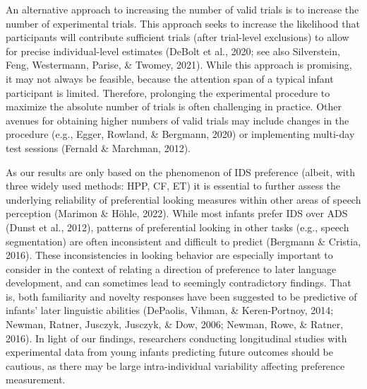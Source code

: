 \documentclass[
  english,
  man,floatsintext]{apa6}
\begin{document}
An alternative approach to increasing the number of valid trials is to increase the number of experimental trials.
This approach seeks to increase the likelihood that participants will contribute sufficient trials (after trial-level exclusions) to allow for precise individual-level estimates (DeBolt et al., 2020; see also Silverstein, Feng, Westermann, Parise, \& Twomey, 2021).
While this approach is promising, it may not always be feasible, because the attention span of a typical infant participant is limited.
Therefore, prolonging the experimental procedure to maximize the absolute number of trials is often challenging in practice.
Other avenues for obtaining higher numbers of valid trials may include changes in the procedure (e.g., Egger, Rowland, \& Bergmann, 2020) or implementing multi-day test sessions (Fernald \& Marchman, 2012).

As our results are only based on the phenomenon of IDS preference (albeit, with three widely used methods: HPP, CF, ET) it is essential to further assess the underlying reliability of preferential looking measures within other areas of speech perception (Marimon \& Höhle, 2022).
While most infants prefer IDS over ADS (Dunst et al., 2012), patterns of preferential looking in other tasks (e.g., speech segmentation) are often inconsistent and difficult to predict (Bergmann \& Cristia, 2016).
These inconsistencies in looking behavior are especially important to consider in the context of relating a direction of preference to later language development, and can sometimes lead to seemingly contradictory findings.
That is, both familiarity and novelty responses have been suggested to be predictive of infants' later linguistic abilities (DePaolis, Vihman, \& Keren-Portnoy, 2014; Newman, Ratner, Jusczyk, Jusczyk, \& Dow, 2006; Newman, Rowe, \& Ratner, 2016).
In light of our findings, researchers conducting longitudinal studies with experimental data from young infants predicting future outcomes should be cautious, as there may be large intra-individual variability affecting preference measurement.
\end{document}
